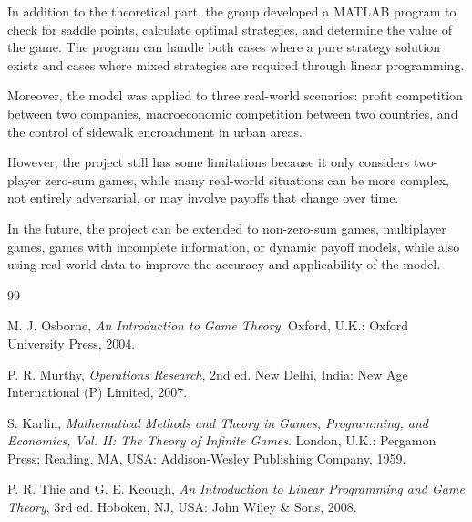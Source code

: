 \documentclass[12pt,a4paper]{article}
\begin{document}
In addition to the theoretical part, the group developed a MATLAB program to check for saddle points, calculate optimal strategies, and determine the value of the game. The program can handle both cases where a pure strategy solution exists and cases where mixed strategies are required through linear programming. 

Moreover, the model was applied to three real-world scenarios: profit competition between two companies, macroeconomic competition between two countries, and the control of sidewalk encroachment in urban areas.

However, the project still has some limitations because it only considers two-player zero-sum games, while many real-world situations can be more complex, not entirely adversarial, or may involve payoffs that change over time. 

In the future, the project can be extended to non-zero-sum games, multiplayer games, games with incomplete information, or dynamic payoff models, while also using real-world data to improve the accuracy and applicability of the model.

\newpage
{}
{}
\begin{thebibliography}{99}

M. J. Osborne, \textit{An Introduction to Game Theory}. Oxford, U.K.: Oxford University Press, 2004.

P. R. Murthy, \textit{Operations Research}, 2nd ed. New Delhi, India: New Age International (P) Limited, 2007.

S. Karlin, \textit{Mathematical Methods and Theory in Games, Programming, and Economics, Vol. II: The Theory of Infinite Games}. London, U.K.: Pergamon Press; Reading, MA, USA: Addison-Wesley Publishing Company, 1959.

P. R. Thie and G. E. Keough, \textit{An Introduction to Linear Programming and Game Theory}, 3rd ed. Hoboken, NJ, USA: John Wiley \& Sons, 2008.

\end{thebibliography}
\end{document}
